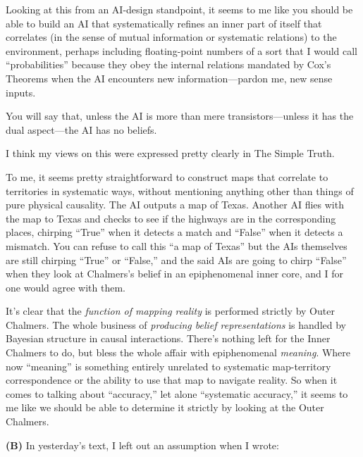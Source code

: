 {
 Looking at this from an AI-design standpoint, it seems to me like
you should be able to build an AI that systematically refines an inner
part of itself that correlates (in the sense of mutual information or
systematic relations) to the environment, perhaps including
floating-point numbers of a sort that I would call
``probabilities'' because they obey
the internal relations mandated by Cox's Theorems when
the AI encounters new information---pardon me, new sense inputs.}

{
 You will say that, unless the AI is more than mere
transistors---unless it has the dual aspect---the AI has no beliefs.}

{
 I think my views on this were expressed pretty clearly in The
Simple Truth.}

{
 To me, it seems pretty straightforward to construct maps that
correlate to territories in systematic ways, without mentioning
anything other than things of pure physical causality. The AI outputs a
map of Texas. Another AI flies with the map to Texas and checks to see
if the highways are in the corresponding places, chirping
``True'' when it detects a match and
``False'' when it detects a
mismatch. You can refuse to call this ``a map of
Texas'' but the AIs themselves are still chirping
``True'' or
``False,'' and the said AIs are
going to chirp ``False'' when they
look at Chalmers's belief in an epiphenomenal inner
core, and I for one would agree with them.}

{
 It's clear that the \textit{function of mapping
reality} is performed strictly by Outer Chalmers. The whole business of
\textit{producing belief representations} is handled by Bayesian
structure in causal interactions. There's nothing left
for the Inner Chalmers to do, but bless the whole affair with
epiphenomenal \textit{meaning}. Where now
``meaning'' is something entirely
unrelated to systematic map-territory correspondence or the ability to
use that map to navigate reality. So when it comes to talking about
``accuracy,'' let alone
``systematic accuracy,'' it seems to
me like we should be able to determine it strictly by looking at the
Outer Chalmers.}

{
 \textbf{(B)} In yesterday's text, I left out an
 assumption when I wrote:}

